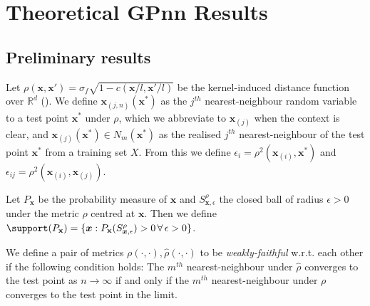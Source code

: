 \section{Theoretical GPnn Results}
\label{detailed_proofs}

\label{appx:nngp}
\subsection{Preliminary results}
    Let \(\rho(\bm{x},\bm{x'})=\sigma_f\sqrt{1-c(\bm{x}/l,\bm{x'}/l)}\) be the kernel-induced distance function over \(\mathbb{R}^d\) (\cite{Scholkopf2001}).
    We define \(\mathbf{x}_{(j,n)}(\bm{x}^*)\) as the \(j^{th}\) nearest-neighbour random variable to a test point \(\bm{x}^*\) under \(\rho\), which we abbreviate to \(\mathbf{x}_{(j)}\) when the context is clear, and \(\bm{x}_{(j)}(\bm{x}^*) \in N_m(\bm{x}^*)\) as the realised \(j^{th}\)
    nearest-neighbour of the test point \(\bm{x}^*\) from a training set \(X\). From this we define \(\epsilon_i = \rho^2(\mathbf{x}_{(i)},\bm{x}^*)\) and \(\epsilon_{ij} = \rho^2(\mathbf{x}_{(i)},\mathbf{x}_{(j)})\).

\begin{definition}[Support]\label{def:support}
    Let \(P_\mathbf{x}\) be the probability measure of \(\mathbf{x}\) and \(S^\rho_{\bm{x},\epsilon}\) the closed ball of radius \(\epsilon>0\) under the metric \(\rho\) centred at \(\bm{x}\). Then we define \(\support(P_\mathbf{x}) = \{\bm{x} : P_\mathbf{x}(S^\rho_{\bm{x},\epsilon})>0\, \forall\,\epsilon >0\}\).
\end{definition}

\begin{definition}\label{def:weakly_faithful}
    We define a pair of metrics \(\rho(\cdot,\cdot),\hat{\rho}(\cdot,\cdot)\) to be \emph{weakly-faithful} w.r.t. each other if the following condition holds: The \(m^{th}\) nearest-neighbour under \(\hat{\rho}\) converges to the test point as \(n\rightarrow\infty\) if and only if the \(m^{th}\) nearest-neighbour under \(\rho\) converges to the test point in the limit.
\end{definition}

